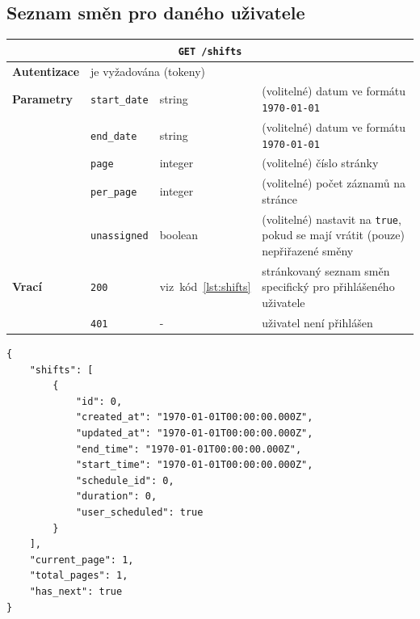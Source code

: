 \documentclass[twoside]{ctuthesis}
\begin{document}
\newpage
\subsection{Seznam směn pro daného uživatele}

\begin{center}
	\begin{tabular}{p{.19\linewidth}p{.18\linewidth}p{.15\linewidth}p{.35\linewidth}}
		\hline
		\multicolumn{4}{c}{\texttt{GET /shifts}}\\
		\hline
		\textbf{Autentizace}  & 	\multicolumn{3}{l}{je vyžadována (tokeny)}\\
		\textbf{Parametry} 		& 	\texttt{start\_date} & string & (volitelné) datum ve formátu \texttt{1970-01-01}  \\
													& 	\texttt{end\_date} & string & (volitelné) datum ve formátu \texttt{1970-01-01} \\
													& 	\texttt{page} & integer & (volitelné) číslo stránky \\
													& 	\texttt{per\_page} & integer & (volitelné) počet záznamů na stránce \\
													& 	\texttt{unassigned} & boolean & (volitelné) nastavit na \texttt{true}, pokud se mají vrátit (pouze) nepřiřazené směny \\
		\textbf{Vrací} 				& 	\texttt{200} & viz~kód~\ref{lst:shifts} & stránkovaný seznam směn specifický pro přihlášeného uživatele\\
									 				& 	\texttt{401} & - & uživatel není přihlášen\\
		\hline
	\end{tabular}
\end{center}

\begin{lstlisting}[caption={Seznam směn},label={lst:shifts}]
{
	"shifts": [
		{
			"id": 0,
			"created_at": "1970-01-01T00:00:00.000Z",
			"updated_at": "1970-01-01T00:00:00.000Z",
			"end_time": "1970-01-01T00:00:00.000Z",
			"start_time": "1970-01-01T00:00:00.000Z",
			"schedule_id": 0,
			"duration": 0,
			"user_scheduled": true
		}
	],
	"current_page": 1,
	"total_pages": 1,
	"has_next": true
}
\end{lstlisting}
\newpage
\end{document}
